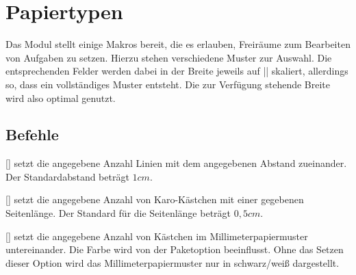 \section{Papiertypen}
\label{modul:papiertypen}
Das Modul  stellt einige Makros bereit, die
es erlauben, Freiräume zum Bearbeiten von Aufgaben zu setzen. Hierzu
stehen verschiedene Muster zur Auswahl. Die entsprechenden Felder werden
dabei in der Breite jeweils auf \verbcode|\linewidth| skaliert, 
allerdings so, dass ein vollständiges Muster entsteht. Die zur Verfügung
stehende Breite wird also optimal genutzt.

\subsection{Befehle}
\begin{commands}
	[]
		setzt die angegebene Anzahl Linien mit dem angegebenen Abstand zueinander. Der Standardabstand beträgt $1cm$.
\begin{example}
\end{example}

	[]
		setzt die angegebene Anzahl von Karo-Kästchen mit einer
		gegebenen Seitenlänge. Der Standard für die Seitenlänge beträgt
		$0,5cm$.
\begin{example}
\end{example}

	[]
		setzt die angegebene Anzahl von Kästchen im
		Millimeterpapiermuster untereinander. Die Farbe wird von der
		Paketoption  beeinflusst. Ohne das Setzen dieser Option wird das Millimeterpapiermuster nur in schwarz/weiß dargestellt.
\begin{example}
\end{example}
\end{commands}
